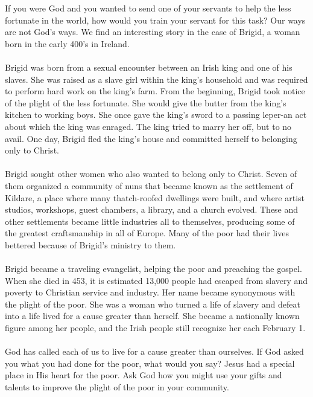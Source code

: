 If you were God and you wanted to send one of your servants to help the less fortunate in the world, how would you train your servant for this task? Our ways are not God's ways. We find an interesting story in the case of Brigid, a woman born in the early 400's in Ireland.\\
\\
\noindent Brigid was born from a sexual encounter between an Irish king and one of his slaves. She was raised as a slave girl within the king's household and was required to perform hard work on the king's farm. From the beginning, Brigid took notice of the plight of the less fortunate. She would give the butter from the king's kitchen to working boys. She once gave the king's sword to a passing leper-an act about which the king was enraged. The king tried to marry her off, but to no avail. One day, Brigid fled the king's house and committed herself to belonging only to Christ.\\
\\
\noindent Brigid sought other women who also wanted to belong only to Christ. Seven of them organized a community of nuns that became known as the settlement of Kildare, a place where many thatch-roofed dwellings were built, and where artist studios, workshops, guest chambers, a library, and a church evolved. These and other settlements became little industries all to themselves, producing some of the greatest craftsmanship in all of Europe. Many of the poor had their lives bettered because of Brigid's ministry to them.\\
\\
\noindent Brigid became a traveling evangelist, helping the poor and preaching the gospel. When she died in 453, it is estimated 13,000 people had escaped from slavery and poverty to Christian service and industry. Her name became synonymous with the plight of the poor. She was a woman who turned a life of slavery and defeat into a life lived for a cause greater than herself. She became a nationally known figure among her people, and the Irish people still recognize her each February 1.\\
\\
\noindent God has called each of us to live for a cause greater than ourselves. If God asked you what you had done for the poor, what would you say? Jesus had a special place in His heart for the poor. Ask God how you might use your gifts and talents to improve the plight of the poor in your community.


